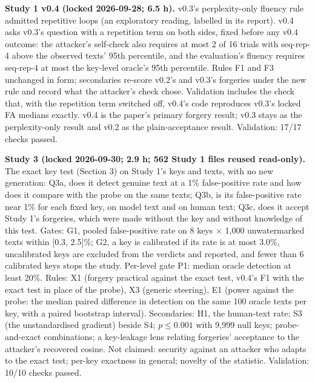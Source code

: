 \documentclass[11pt,letterpaper]{article}
\begin{document}
\textbf{Study 1 v0.4 (locked 2026-09-28; 6.5 h).} v0.3's perplexity-only fluency rule admitted repetitive loops (an exploratory reading, labelled in its report). v0.4 asks v0.3's question with a repetition term on both sides, fixed before any v0.4 outcome: the attacker's self-check also requires at most 2 of 16 trials with seq-rep-4 above the observed texts' 95th percentile, and the evaluation's fluency requires seq-rep-4 at most the key-level oracle's 95th percentile. Rules F1 and F3 unchanged in form; secondaries re-score v0.2's and v0.3's forgeries under the new rule and record what the attacker's check chose. Validation includes the check that, with the repetition term switched off, v0.4's code reproduces v0.3's locked FA medians exactly. v0.4 is the paper's primary forgery result; v0.3 stays as the perplexity-only result and v0.2 as the plain-acceptance result. Validation: 17/17 checks passed.

\textbf{Study 3 (locked 2026-09-30; 2.9 h; 562 Study 1 files reused read-only).} The exact key test (Section 3) on Study 1's keys and texts, with no new generation: Q3a, does it detect genuine text at a 1\% false-positive rate and how does it compare with the probe on the same texts; Q3b, is its false-positive rate near 1\% for each fixed key, on model text and on human text; Q3c, does it accept Study 1's forgeries, which were made without the key and without knowledge of this test. Gates: G1, pooled false-positive rate on 8 keys \ensuremath{\times} 1,000 unwatermarked texts within {[}0.3, 2.5{]}\%; G2, a key is calibrated if its rate is at most 3.0\%, uncalibrated keys are excluded from the verdicts and reported, and fewer than 6 calibrated keys stops the study. Per-level gate P1: median oracle detection at least 20\%. Rules: X1 (forgery practical against the exact test, v0.4's F1 with the exact test in place of the probe), X3 (generic steering), E1 (power against the probe: the median paired difference in detection on the same 100 oracle texts per key, with a paired bootstrap interval). Secondaries: H1, the human-text rate; S3 (the unstandardised gradient) beside S4; \(p \leq 0.001\) with 9,999 null keys; probe-and-exact combinations; a key-leakage lens relating forgeries' acceptance to the attacker's recovered cosine. Not claimed: security against an attacker who adapts to the exact test; per-key exactness in general; novelty of the statistic. Validation: 10/10 checks passed.
\end{document}
